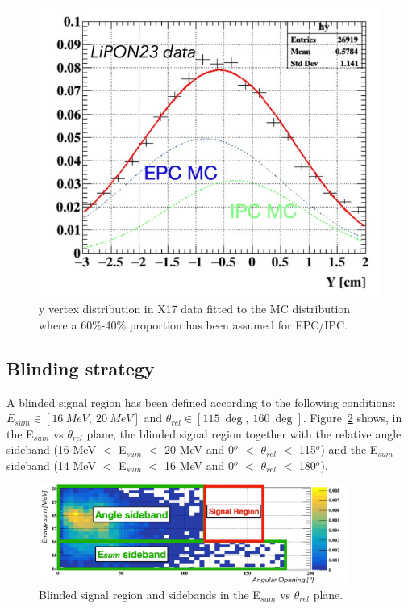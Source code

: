 \begin{refsection}
        \begin{figure}[]
            \centering
            \includegraphics[scale=0.5]{Figures/X17/Analysis/BeamSpotFit.pdf}
            \caption{y vertex distribution in X17 data fitted to the MC distribution where a 60$\%$-40$\%$ proportion has been assumed for EPC/IPC.}
            \label{fig:beamspotfit}
        \end{figure}

    \subsection{Blinding strategy}\label{sec:blind}
    A blinded signal region has been defined according to the following conditions: $E_{sum}\in[\SI{16}{MeV},\ \SI{20}{MeV}]$ and $\theta_{rel}\in[\SI{115}{\deg},\ \SI{160}{\deg}]$.
    Figure~\ref{fig:regions} shows, in the E$_{sum}$ vs $\theta_{rel}$ plane, the blinded signal region together with the relative angle sideband (16 MeV $<$ E$_{sum}$ $<$ 20 MeV and 0$^o$ $<$ $\theta_{rel}$ $<$ 115$^o$) and the E$_{sum}$ sideband (14 MeV $<$ E$_{sum}$ $<$ 16 MeV and 0$^o$ $<$ $\theta_{rel}$ $<$ 180$^o$).
    \begin{figure}[htbp]
        \centering
        \includegraphics[width = 0.9\textwidth]{Figures/X17/Analysis/Regions.pdf}  
        \caption{Blinded signal region and sidebands in the E$_{sum}$ vs $\theta_{rel}$ plane.}
         \label{fig:regions}
    \end{figure}


\end{refsection}
